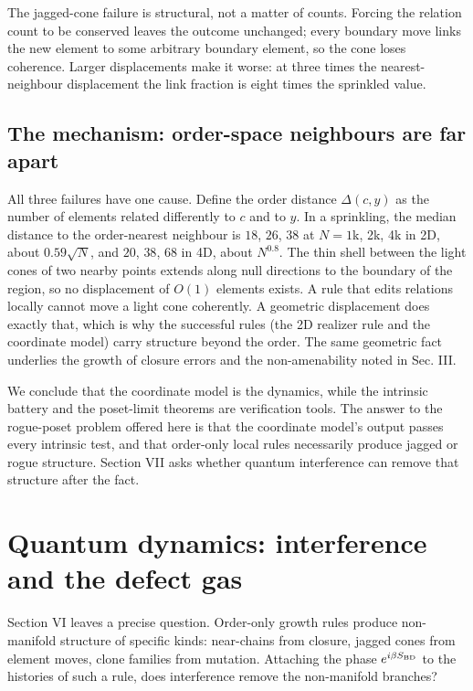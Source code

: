 The jagged-cone failure is structural, not a matter of
counts. Forcing the relation count to be conserved leaves
the outcome unchanged; every boundary move links the new
element to some arbitrary boundary element, so the cone
loses coherence. Larger displacements make it worse: at
three times the nearest-neighbour displacement the link
fraction is eight times the sprinkled value.

\hypertarget{the-mechanism-order-space-neighbours-are-far-apart}{%
\subsection{The mechanism: order-space neighbours are far
apart}\label{the-mechanism-order-space-neighbours-are-far-apart}}

All three failures have one cause. Define the order distance
\(\Delta(c,y)\) as the number of elements related
differently to \(c\) and to \(y\). In a sprinkling, the
median distance to the order-nearest neighbour is \(18\),
\(26\), \(38\) at \(N=1\)k, 2k, 4k in 2D, about
\(0.59\sqrt N\), and \(20\), \(38\), \(68\) in 4D, about
\(N^{0.8}\). The thin shell between the light cones of two
nearby points extends along null directions to the boundary
of the region, so no displacement of \(O(1)\) elements
exists. A rule that edits relations locally cannot move a
light cone coherently. A geometric displacement does exactly
that, which is why the successful rules (the 2D realizer
rule and the coordinate model) carry structure beyond the
order. The same geometric fact underlies the growth of
closure errors and the non-amenability noted in Sec. III.

We conclude that the coordinate model is the dynamics, while
the intrinsic battery and the poset-limit theorems are
verification tools. The answer to the rogue-poset problem
offered here is that the coordinate model's output passes
every intrinsic test, and that order-only local rules
necessarily produce jagged or rogue structure. Section VII
asks whether quantum interference can remove that structure
after the fact.

\hypertarget{quantum-dynamics-interference-and-the-defect-gas}{%
\section{Quantum dynamics: interference and the defect
gas}\label{quantum-dynamics-interference-and-the-defect-gas}}

Section VI leaves a precise question. Order-only growth
rules produce non-manifold structure of specific kinds:
near-chains from closure, jagged cones from element moves,
clone families from mutation. Attaching the phase
\(e^{i\beta S_{\rm BD}}\) to the histories of such a rule,
does interference remove the non-manifold branches?

